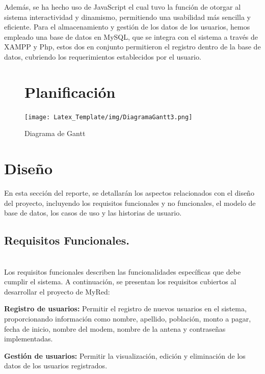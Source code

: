\documentclass[a4paper,12pt]{article}
\begin{document}
Además, se  ha hecho uso de JavaScript el cual tuvo la función de otorgar al sistema interactividad y dinamismo, permitiendo una usabilidad más sencilla y eficiente. Para el almacenamiento y gestión de los datos de los usuarios, hemos empleado una base de datos en MySQL, que se integra con el sistema a través de XAMPP y Php, estos dos en conjunto permitieron el registro dentro de la base de datos, cubriendo los requerimientos establecidos por el usuario.


\newpage
\begin{landscape}
  \begin{figure}
  \section{Planificación}
    \centering
    \texttt{[image: Latex\_Template/img/DiagramaGantt3.png]}
    \caption{Diagrama de Gantt}
    \label{fig:image}
  \end{figure}
\end{landscape}

\newpage
\section{Diseño}
En esta sección del reporte, se detallarán los aspectos relacionados con el diseño del proyecto, incluyendo los requisitos funcionales y no funcionales, el modelo de base de datos, los casos de uso y las historias de usuario.

\subsection{\textbf{Requisitos Funcionales.}} \\
Los requisitos funcionales describen las funcionalidades específicas que debe cumplir el sistema. A continuación, se presentan los requisitos cubiertos al desarrollar el proyecto de MyRed:

\textbf{Registro de usuarios:} Permitir el registro de nuevos usuarios en el sistema, proporcionando información como nombre, apellido, población, monto a pagar, fecha de inicio, nombre del modem, nombre de la antena y contraseñas implementadas. 

\textbf{Gestión de usuarios:} Permitir la visualización, edición y eliminación de los datos de los usuarios registrados.
\end{document}
